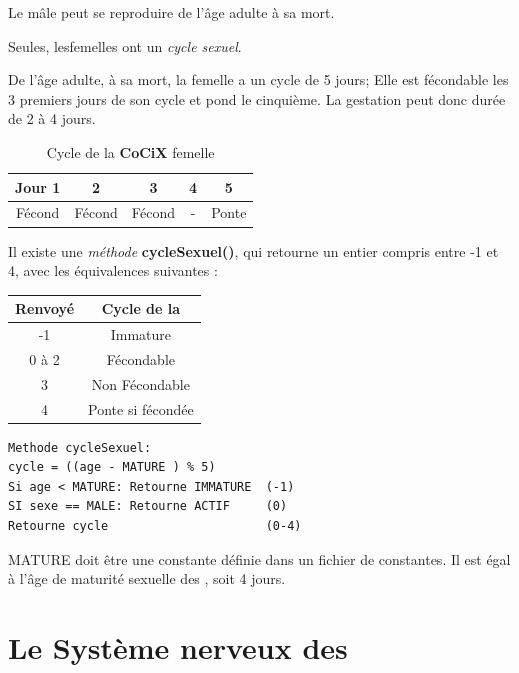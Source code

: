 \documentclass[french]{report}
\begin{document}
Le \CoCiX mâle peut se reproduire de l'âge adulte à sa mort.

Seules, les\CoCiX femelles ont un \emph{cycle sexuel}.


De l'âge adulte, à sa mort, la \CoCiX femelle a un cycle de 5 jours; Elle est fécondable les 3 premiers jours de son cycle et pond le cinquième. La gestation peut donc durée de 2 à 4 jours.

\begin{table}[htdp]
	\caption{Cycle de la \textbf{CoCiX} femelle}
	\begin{center}
		\begin{tabular}{|c|c|c|c|c|}\hline
			Jour 1 & 2 & 3 & 4 & 5 \\ \hline
			Fécond & Fécond & Fécond & - & Ponte\\ \hline
		\end{tabular}
	\end{center}
\end{table}

Il existe une \emph{méthode} \textbf{cycleSexuel()}, qui retourne un entier compris entre -1 et 4, avec les équivalences suivantes :
\begin{center}
	\begin{tabular}{|c|c|}\hline
		Renvoyé & Cycle de la \CoCiX \\ \hline
		-1 & Immature\\ \hline
		0 à 2 & Fécondable\\ \hline
		3& Non Fécondable\\ \hline
		4& Ponte si fécondée\\ \hline
	\end{tabular}
\end{center}

\begin{lstlisting}
Methode cycleSexuel:
cycle = ((age - MATURE ) % 5)
Si age < MATURE: Retourne IMMATURE	(-1)
SI sexe == MALE: Retourne ACTIF     (0)
Retourne cycle                      (0-4)
\end{lstlisting}	
MATURE doit être une constante définie dans un fichier de constantes. Il est égal à l'âge de maturité sexuelle des \CoCiX, soit 4 jours.


\newpage
\section{Le Système nerveux des \CoCiX}\label{nerveux}
\end{document}
